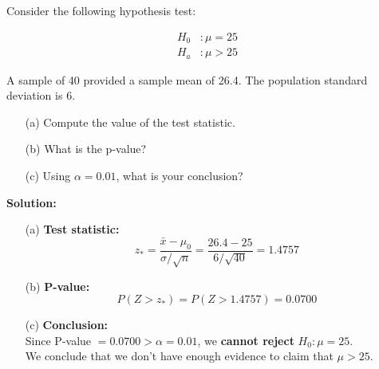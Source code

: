 \begin{example}

Consider the following hypothesis test:

\begin{align*}
H_0 &: \mu = 25 \\
H_a &: \mu > 25
\end{align*}


A sample of 40 provided a sample mean of 26.4. The population standard deviation is 6.

\begin{enumerate}
    \item[(a)] Compute the value of the test statistic.
    \item[(b)] What is the p-value?
    \item[(c)] Using $\alpha = 0.01$, what is your conclusion?
\end{enumerate}

\textbf{Solution:}

\begin{enumerate}
    \item[(a)] \textbf{Test statistic:}
    \[
    z_\ast = \frac{\bar{x} - \mu_0}{\sigma / \sqrt{n}} = \frac{26.4 - 25}{6 / \sqrt{40}} = 1.4757
    \]

    \item[(b)] \textbf{P-value:}
    \[
    P(Z > z_\ast) = P(Z > 1.4757) = 0.0700
    \]

    \item[(c)] \textbf{Conclusion:} \\
    Since P-value $= 0.0700 > \alpha = 0.01$, we \textbf{cannot reject} $H_0 : \mu = 25$. \\
    We conclude that we don’t have enough evidence to claim that $\mu > 25$.
\end{enumerate}

\end{example}
